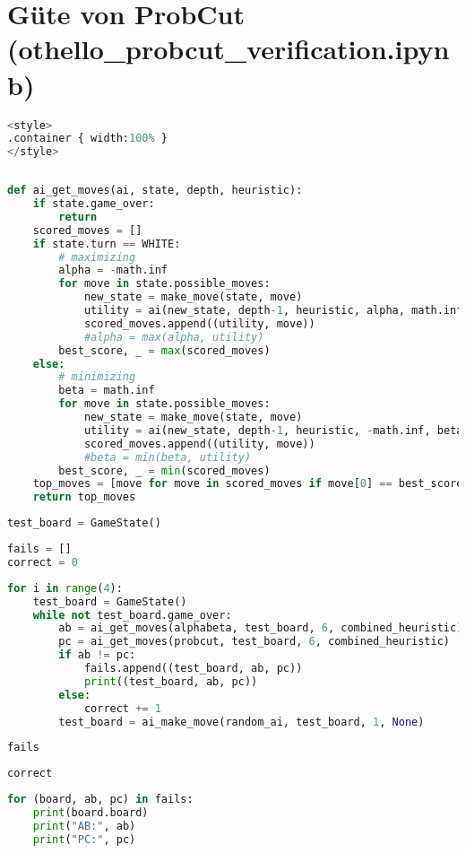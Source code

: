 \hypertarget{guxfcte-von-probcut-othello_probcut_verification.ipynb}{%
\section{Güte von ProbCut
(othello\_probcut\_verification.ipynb)}\label{guxfcte-von-probcut-othello_probcut_verification.ipynb}}

\begin{lstlisting}[language=Python]
%%HTML
<style>
.container { width:100% }
</style>
\end{lstlisting}

\begin{lstlisting}[language=Python]
%run othello_ai.ipynb
\end{lstlisting}

\begin{lstlisting}[language=Python]
def ai_get_moves(ai, state, depth, heuristic):
    if state.game_over:
        return
    scored_moves = []
    if state.turn == WHITE:
        # maximizing
        alpha = -math.inf
        for move in state.possible_moves:
            new_state = make_move(state, move)
            utility = ai(new_state, depth-1, heuristic, alpha, math.inf)
            scored_moves.append((utility, move))
            #alpha = max(alpha, utility)
        best_score, _ = max(scored_moves)
    else:
        # minimizing
        beta = math.inf
        for move in state.possible_moves:
            new_state = make_move(state, move)
            utility = ai(new_state, depth-1, heuristic, -math.inf, beta)
            scored_moves.append((utility, move))
            #beta = min(beta, utility)
        best_score, _ = min(scored_moves)
    top_moves = [move for move in scored_moves if move[0] == best_score]
    return top_moves
\end{lstlisting}

\begin{lstlisting}[language=Python]
test_board = GameState()
\end{lstlisting}

\begin{lstlisting}[language=Python]
fails = []
correct = 0
\end{lstlisting}

\begin{lstlisting}[language=Python]
for i in range(4):
    test_board = GameState()
    while not test_board.game_over:
        ab = ai_get_moves(alphabeta, test_board, 6, combined_heuristic)
        pc = ai_get_moves(probcut, test_board, 6, combined_heuristic)
        if ab != pc:
            fails.append((test_board, ab, pc))
            print((test_board, ab, pc))
        else:
            correct += 1
        test_board = ai_make_move(random_ai, test_board, 1, None)
\end{lstlisting}

\begin{lstlisting}[language=Python]
fails
\end{lstlisting}

\begin{lstlisting}[language=Python]
correct
\end{lstlisting}

\begin{lstlisting}[language=Python]
for (board, ab, pc) in fails:
    print(board.board)
    print("AB:", ab)
    print("PC:", pc)
\end{lstlisting}
